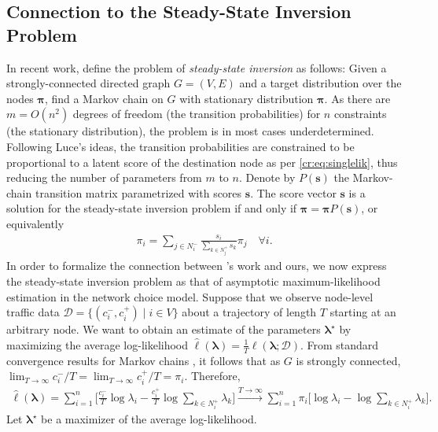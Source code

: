 \subsection{Connection to the Steady-State Inversion Problem}

In recent work, \citet{kumar2015inverting} define the problem of \emph{steady-state inversion} as follows:
Given a strongly-connected directed graph $G = (V, E)$ and a target distribution over the nodes $\bm{\pi}$, find a Markov chain on $G$ with stationary distribution $\bm{\pi}$.
As there are $m = O(n^2)$ degrees of freedom (the transition probabilities) for $n$ constraints (the stationary distribution), the problem is in most cases underdetermined.
Following Luce's ideas, the transition probabilities are constrained to be proportional to a latent score of the destination node as per \eqref{cr:eq:singlelik}, thus reducing the number of parameters from $m$ to $n$.
Denote by $P(\bm{s})$ the Markov-chain transition matrix parametrized with scores $\bm{s}$.
The score vector $\bm{s}$ is a solution for the steady-state inversion problem if and only if $\bm{\pi} = \bm{\pi} P(\bm{s})$, or equivalently
\begin{align}
\label{cr:eq:balance}
\pi_i = \sum_{j \in N^-_i} \frac{s_i}{\sum_{k \in N^+_j} s_k} \pi_j \quad \forall i.
\end{align}
In order to formalize the connection between \citeauthor{kumar2015inverting}'s work and ours, we now express the steady-state inversion problem as that of asymptotic maximum-likelihood estimation in the network choice model.
Suppose that we observe node-level traffic data $\mathcal{D} = \{ (c^-_i, c^+_i) \mid i \in V \}$ about a trajectory of length $T$ starting at an arbitrary node.
We want to obtain an estimate of the parameters $\bm{\lambda}^\star$ by maximizing the average log-likelihood $\hat{\ell}(\bm{\lambda}) = \frac{1}{T} \ell (\bm{\lambda} ; \mathcal{D})$.
From standard convergence results for Markov chains \citep{kemeny1976finite}, it follows that as $G$ is strongly connected, $\lim_{T \to \infty} c^-_i / T = \lim_{T \to \infty} c^+_i / T = \pi_i$.
Therefore,
\begin{align*}
\hat{\ell}(\bm{\lambda})
    = \sum_{i = 1}^n \bigg[ \frac{c^-_i}{T} \log \lambda_i - \frac{c^+_i}{T} \log \sum_{k \in N^+_i} \lambda_k \bigg]
    \xrightarrow{T \to \infty} \sum_{i = 1}^n \pi_i \bigg[ \log \lambda_i - \log \sum_{k \in N^+_i} \lambda_k \bigg].
\end{align*}
Let $\bm{\lambda}^\star$ be a maximizer of the average log-likelihood.
